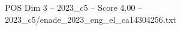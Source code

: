 \begin{textsample}{POS Dim 3 – 2023\_c5 – Score 4.00 – 2023\_c5/enade\_2023\_eng\_el\_ca14304256.txt}
\end{textsample}
